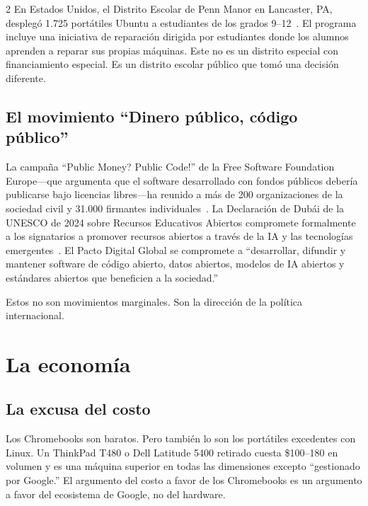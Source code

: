\documentclass[11pt, a4paper]{article}
\begin{document}
\begin{multicols}{2}
En Estados Unidos, el Distrito Escolar de Penn Manor en Lancaster, PA, desplegó 1.725 portátiles Ubuntu a estudiantes de los grados 9--12~\citep{pennmanor2024linux}. El programa incluye una iniciativa de reparación dirigida por estudiantes donde los alumnos aprenden a reparar sus propias máquinas. Este no es un distrito especial con financiamiento especial. Es un distrito escolar público que tomó una decisión diferente.

\subsection{El movimiento ``Dinero público, código público''}

La campaña ``Public Money? Public Code!'' de la Free Software Foundation Europe---que argumenta que el software desarrollado con fondos públicos debería publicarse bajo licencias libres---ha reunido a más de 200 organizaciones de la sociedad civil y 31.000 firmantes individuales~\citep{fsfe2024publiccode}. La Declaración de Dubái de la UNESCO de 2024 sobre Recursos Educativos Abiertos compromete formalmente a los signatarios a promover recursos abiertos a través de la IA y las tecnologías emergentes~\citep{unesco2024oer}. El Pacto Digital Global se compromete a ``desarrollar, difundir y mantener software de código abierto, datos abiertos, modelos de IA abiertos y estándares abiertos que beneficien a la sociedad.''

Estos no son movimientos marginales. Son la dirección de la política internacional.


\section{La economía}

\subsection{La excusa del costo}

Los Chromebooks son baratos. Pero también lo son los portátiles excedentes con Linux. Un ThinkPad T480 o Dell Latitude 5400 retirado cuesta \$100--180 en volumen y es una máquina superior en todas las dimensiones excepto ``gestionado por Google.'' El argumento del costo a favor de los Chromebooks es un argumento a favor del ecosistema de Google, no del hardware.


\end{multicols}
\end{document}
